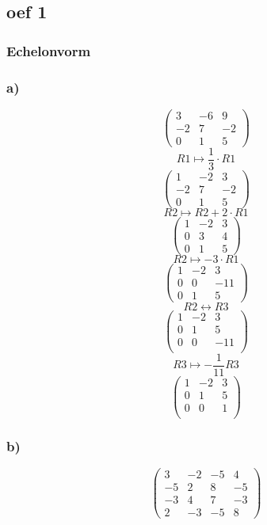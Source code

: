 \documentclass[lineaire_algebra_oplossingen.tex]{subfiles}
\begin{document}
\subsection{oef 1}
\subsubsection*{Echelonvorm}
\subsubsection*{a)}
$$\begin{pmatrix}
3 & -6 & 9\\
-2 & 7 & -2\\
0 & 1 & 5
\end{pmatrix}
$$
$$ R1 \longmapsto \frac{1}{3}\cdot R1$$
$$\begin{pmatrix}
1 & -2 & 3\\
-2 & 7 & -2\\
0 & 1 & 5
\end{pmatrix}
$$
$$R2 \longmapsto R2 + 2\cdot R1$$
$$\begin{pmatrix}
1 & -2 & 3\\
0 & 3 & 4\\
0 & 1 & 5
\end{pmatrix}
$$
$$
R2 \longmapsto - 3\cdot R1
$$
$$\begin{pmatrix}
1 & -2 & 3\\
0 & 0 & -11\\
0 & 1 & 5
\end{pmatrix}
$$
$$R2 \leftrightarrow R3$$
$$\begin{pmatrix}
1 & -2 & 3\\
0 & 1 & 5\\
0 & 0 & -11\\
\end{pmatrix}
$$
$$R3 \longmapsto -\frac{1}{11} R3$$
$$\begin{pmatrix}
1 & -2 & 3\\
0 & 1 & 5\\
0 & 0 & 1\\
\end{pmatrix}
$$
\subsubsection*{b)}

$$
\begin{pmatrix}
3 & -2 & -5 & 4\\
-5 & 2 & 8 & -5\\
-3 & 4 & 7 & -3\\
2 & -3 & -5 & 8
\end{pmatrix}
$$
\end{document}
